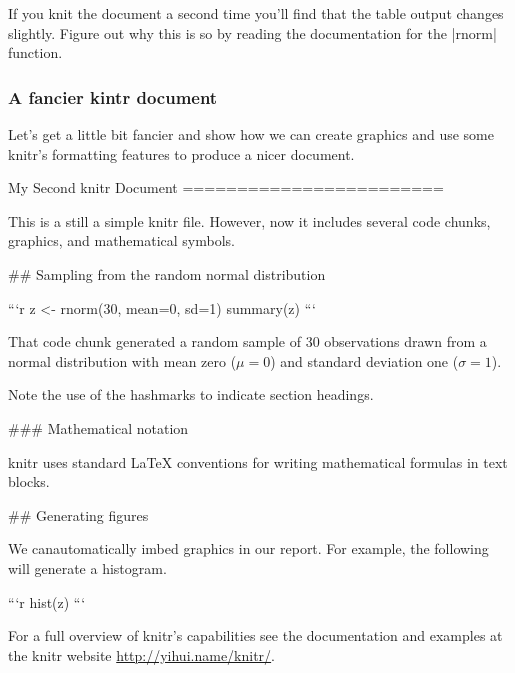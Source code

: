 If you knit the document a second time you'll find that the table output changes slightly. Figure out why this is so by reading the documentation for the |rnorm| function.




\subsubsection{A fancier kintr document}

Let's get a little bit fancier and show how we can create graphics and
use some knitr's formatting features to produce a nicer document.


\begin{noindentcodeblock}
My Second knitr Document
========================

This is a still a simple knitr file. However, now it includes several code chunks, graphics, and mathematical symbols.

## Sampling from the random normal distribution

```{r}
z <- rnorm(30, mean=0, sd=1)
summary(z)
```

That code chunk generated a random sample of 30 observations drawn from a normal distribution with mean zero ($\mu = 0$) and standard deviation one ($\sigma = 1$). 

Note the use of the hashmarks to indicate section headings.  

### Mathematical notation 

knitr uses standard LaTeX conventions for writing mathematical formulas in text blocks.

## Generating figures

We canautomatically imbed graphics in our report. For example, the following will generate a histogram.

```{r}
hist(z)
```
\end{noindentcodeblock}


For a full overview of knitr's capabilities see the documentation and examples at the knitr website \url{http://yihui.name/knitr/}.